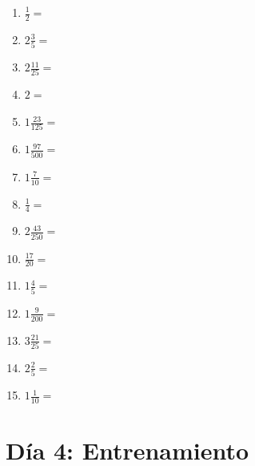 \documentclass[12pt]{article}
\begin{document}
\begin{enumerate}
\item \large $ \frac{1}{2} = $ \vspace{1.5cm}
\item \large $ 2 \frac{3}{5} = $ \vspace{1.5cm}
\item \large $ 2 \frac{11}{25} = $ \vspace{1.5cm}
\item \large $ 2 = $ \vspace{1.5cm}
\item \large $ 1 \frac{23}{125} = $ \vspace{1.5cm}
\newpage
\item \large $ 1 \frac{97}{500} = $ \vspace{1.5cm}
\item \large $ 1 \frac{7}{10} = $ \vspace{1.5cm}
\item \large $ \frac{1}{4} = $ \vspace{1.5cm}
\item \large $ 2 \frac{43}{250} = $ \vspace{1.5cm}
\item \large $ \frac{17}{20} = $ \vspace{1.5cm}
\item \large $ 1 \frac{4}{5} = $ \vspace{1.5cm}
\item \large $ 1 \frac{9}{200} = $ \vspace{1.5cm}
\item \large $ 3 \frac{21}{25} = $ \vspace{1.5cm}
\item \large $ 2 \frac{2}{5} = $ \vspace{1.5cm}
\item \large $ 1 \frac{1}{10} = $ \vspace{1.5cm}
\end{enumerate}\newpage
\section*{Día 4: Entrenamiento}
\end{document}
